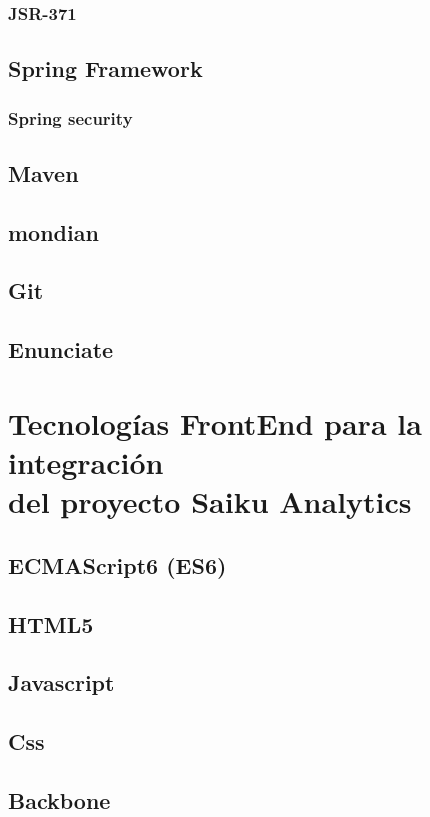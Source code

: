 		\subsubsection{JSR-371}
		\lipsum[1-2]
	\subsection{Spring Framework}
			\lipsum[1-2]
		\subsubsection{Spring security}
				\lipsum[1-2]
	\subsection{Maven}
			\lipsum[1-2]
	\subsection{mondian}
			\lipsum[1-2]
	\subsection{Git}
			\lipsum[1-2]
	\subsection{Enunciate}
			\lipsum[1-2]
\section{Tecnolog\'{i}as FrontEnd para la integraci\'{o}n\\
		 del proyecto Saiku Analytics}
		\lipsum[1-2]
	\subsection{ECMAScript6 (ES6)}
			\lipsum[1-2]
	\subsection{HTML5}
			\lipsum[1-2]
	\subsection{Javascript}
			\lipsum[1-2]
	\subsection{Css}
			\lipsum[1-2]
	\subsection{Backbone}
			\lipsum[1-2]
